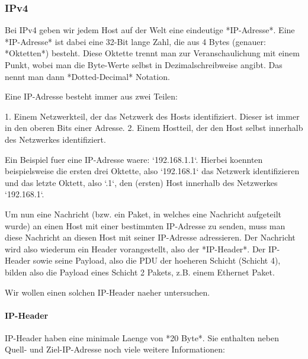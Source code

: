 \subsubsection{IPv4} 

Bei IPv4 geben wir jedem Host auf der Welt eine eindeutige *IP-Adresse*. Eine
*IP-Adresse* ist dabei eine 32-Bit lange Zahl, die aus 4 Bytes (genauer:
*Oktetten*) besteht. Diese Oktette trennt man zur Veranschaulichung mit einem
Punkt, wobei man die Byte-Werte selbst in Dezimalschreibweise angibt. Das nennt
man dann *Dotted-Decimal* Notation.

Eine IP-Adresse besteht immer aus zwei Teilen:

1. Einem Netzwerkteil, der das Netzwerk des Hosts identifiziert. Dieser ist
   immer in den oberen Bits einer Adresse.
2. Einem Hostteil, der den Host selbst innerhalb des Netzwerkes identifiziert.

Ein Beispiel fuer eine IP-Adresse waere: `192.168.1.1`. Hierbei koennten
beispielsweise die ersten drei Oktette, also `192.168.1` das Netzwerk
identifizieren und das letzte Oktett, also `.1`, den (ersten) Host innerhalb des
Netzwerkes `192.168.1`.

Um nun eine Nachricht (bzw. ein Paket, in welches eine Nachricht aufgeteilt
wurde) an einen Host mit einer bestimmten IP-Adresse zu senden, muss man diese
Nachricht an diesen Host mit seiner IP-Adresse adressieren. Der Nachricht wird
also wiederum ein Header vorangestellt, also der *IP-Header*. Der IP-Header
sowie seine Payload, also die PDU der hoeheren Schicht (Schicht 4), bilden also
die Payload eines Schicht 2 Pakets, z.B. einem Ethernet Paket.

Wir wollen einen solchen IP-Header naeher untersuchen.

\paragraph{IP-Header} 

IP-Header haben eine minimale Laenge von *20 Byte*. Sie enthalten neben Quell- und
Ziel-IP-Adresse noch viele weitere Informationen:

